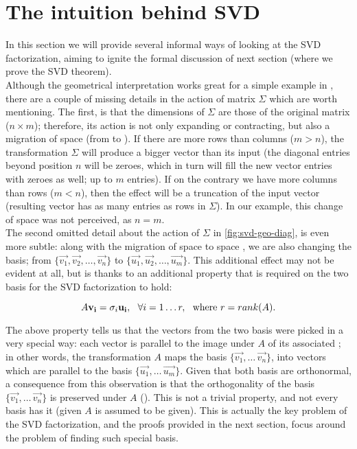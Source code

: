 \section{The intuition behind SVD}

In this section we will provide several informal ways of looking at
the SVD factorization, aiming to ignite the formal discussion of next
section (where we prove the SVD theorem). \\





Although the geometrical interpretation works great for a simple
example in , there are a couple of missing details in the action of
matrix $\Sigma$ which are worth mentioning. The first, is that the
dimensions of $\Sigma$ are those of the original matrix ($n \times
m$); therefore, its action is not only expanding or contracting, but
also a migration of space (from  to ). If there are more
rows than columns ($m > n$), the transformation $\Sigma$ will produce
a bigger vector than its input (the diagonal entries beyond position
$n$ will be zeroes, which in turn will fill the new vector entries
with zeroes as well; up to $m$ entries). If on the contrary we have
more columns than rows ($m < n$), then the effect will be a truncation
of the input vector (resulting vector has as many entries as rows in
$\Sigma$). In our example, this change of space was not perceived, as $n
= m$. \\

The second omitted detail about the action of $\Sigma$ in 
\cref{fig:svd-geo-diag}, is even more subtle: along with the migration
of space  to space , we are also changing the basis; from
$\{\vec{v_1},\vec{v_2},\dots,\vec{v_n}\}$ to
$\{\vec{u_1},\vec{u_2},\dots,\vec{u_m}\}$. This additional effect may
not be evident at all, but is thanks to an additional property that
is required on the two basis for the SVD factorization to hold:

\[
A\mathbf{v_i} = \sigma_i\mathbf{u_i}, \,\,\,\,\forall i=1 \dots r, \,\,\,\,\text{where
} r = rank(A).
\]
\hfill

The above property tells us that the vectors from the two basis were
picked in a very special way: each vector  is parallel to the
image under $A$ of its associated ; in other words, the
transformation $A$ maps the  basis
$\{\vec{v_1},\dots\,\vec{v_n}\}$, into vectors which are parallel to
the  basis $\{\vec{u_1},\dots\,\vec{u_m}\}$. Given that both basis
are orthonormal, a consequence from this observation is that the
orthogonality of the basis $\{\vec{v_1},\dots\,\vec{v_n}\}$ is preserved
under $A$ (\cite{kalman96}). This is not a trivial property, and not
every basis has it (given $A$ is assumed to be given). This is
actually the key problem of the SVD factorization, and the proofs
provided in the next section, focus around the problem of finding such
special basis.  

